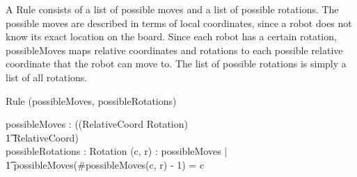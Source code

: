\documentclass[12pt]{article}
\begin{document}
A Rule consists of a list of possible moves and a list of possible rotations. The possible moves are described in terms of local coordinates, since a robot does not know its exact location on the board. Since each robot has a certain rotation, possibleMoves maps relative coordinates and rotations to each possible relative coordinate that the robot can move to. The list of possible rotations is simply a list of all rotations.
\begin{class}{Rule}
\upharpoonright (possibleMoves, possibleRotations) \\
\begin{state}
possibleMoves : \power ((RelativeCoord \times Rotation) \psurj \\ \t1 \seq RelativeCoord) \\
possibleRotations : \power Rotation
\where
\forall (c, r) : \dom possibleMoves | \\ \t1 possibleMoves(\#possibleMoves(c, r) - 1) = c
\end{state} \\
\end{class}
\end{document}
